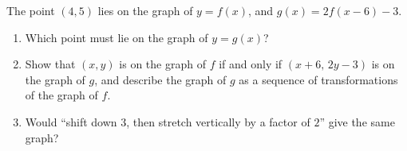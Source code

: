 The point $(4,5)$ lies on the graph of $y=f(x)$, and $g(x)=2f(x-6)-3$.
\begin{enumerate}
\item[(a)] Which point must lie on the graph of $y=g(x)$?
\item[(b)] Show that $(x,y)$ is on the graph of $f$ if and only if $(x+6,\,2y-3)$ is on the graph of $g$, and describe the graph of $g$ as a sequence of transformations of the graph of $f$.
\item[(c)] Would ``shift down $3$, then stretch vertically by a factor of $2$'' give the same graph?
\end{enumerate}
